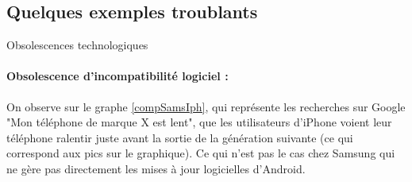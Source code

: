 \subsection{Quelques exemples troublants}


Obsolescences technologiques

\paragraph*{Obsolescence d’incompatibilité logiciel :}

On observe sur le graphe \ref{compSamsIph}, qui représente les recherches sur Google "Mon téléphone de marque X est lent", que les utilisateurs d'iPhone voient leur téléphone ralentir juste avant la sortie de la génération suivante (ce qui correspond aux pics sur le graphique). Ce qui n'est pas le cas chez Samsung qui ne gère pas directement les mises à jour logicielles d'Android.

